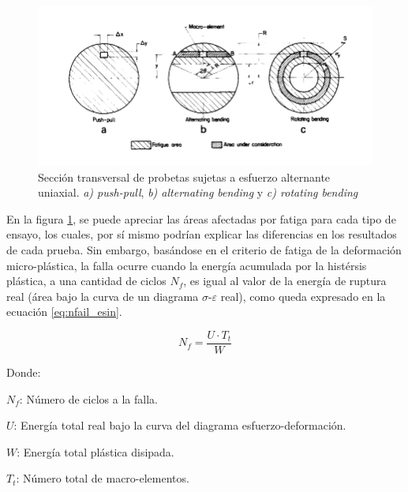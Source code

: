 \begin{figure}[h]
\centering
\includegraphics[scale=1]{Imagenes/affectedarea_fatigue.pdf}
\caption{Sección transversal de probetas sujetas a esfuerzo alternante uniaxial. \textit{a) push-pull}, \textit{b) alternating bending} y \textit{c) rotating bending}}
\label{fig:affar_fat}
\end{figure}

En la figura \ref{fig:affar_fat}, se puede apreciar las áreas afectadas por fatiga para cada tipo de ensayo, los cuales, por sí mismo podrían explicar las diferencias en los resultados de cada prueba. Sin embargo, basándose en el criterio de fatiga de la deformación micro-plástica, la falla ocurre cuando la energía acumulada por la histérsis plástica, a una cantidad de ciclos $N_f$, es igual al valor de la energía de ruptura real (área bajo la curva de un diagrama $\sigma$-$\varepsilon$ real), como queda expresado en la ecuación \ref{eq:nfail_esin}.

\begin{equation}\label{eq:nfail_esin}
	N_f = \frac{U \cdot T_t}{W} 
\end{equation}

Donde:
\begin{itemize*}
	\item $N_f$: Número de ciclos a la falla.
	\item $U$: Energía total real bajo la curva del diagrama esfuerzo-deformación.
	\item $W$: Energía total plástica disipada.
	\item $T_t$: Número total de macro-elementos.
\end{itemize*}

